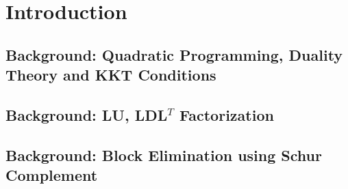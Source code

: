 \chapter{Introduction}\label{chapter:Introduction}



\section{Background: Quadratic Programming, Duality Theory and KKT Conditions}\label{qp_back}
\section{Background: LU, LDL\(^{T}\) Factorization}
\section{Background: Block Elimination using Schur Complement}
